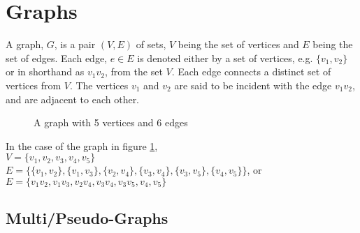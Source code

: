 
\section*{Graphs}

A graph, $G$, is a pair $(V, E)$ of sets, $V$ being the set of vertices and $E$ being the set of edges. Each edge,
 $e \in E$ is denoted either by a set of vertices, e.g. $\{v_1, v_2\}$ or in shorthand as $v_1v_2$, from the set $V$.
 Each edge connects a distinct set of vertices from $V$. The vertices $v_1$ and $v_2$ are said to be incident with the
 edge $v_1v_2$, and are adjacent to each other.

\begin{minipage}[c]{0.3\linewidth}
  \begin{figure}[H]
    \centering
    \usetikzlibrary{graphs}
    \caption{A graph with 5 vertices and 6 edges}
    \label{fig:graph1}
  \end{figure}
\end{minipage}\hfill
\begin{minipage}{0.6\linewidth}
In the case of the graph in figure \ref*{fig:graph1},\\
$V = \{v_1, v_2, v_3, v_4, v_5\}$\\
$E = \{\{v_1, v_2\}, \{v_1, v_3\}, \{v_2, v_4\}, \{v_3, v_4\}, \{v_3, v_5\}, \{v_4, v_5\}\}$, or\\
$E = \{v_1v_2, v_1v_3, v_2v_4, v_3v_4, v_3v_5, v_4,v_5\}$
\end{minipage}

\subsection*{Multi/Pseudo-Graphs}


